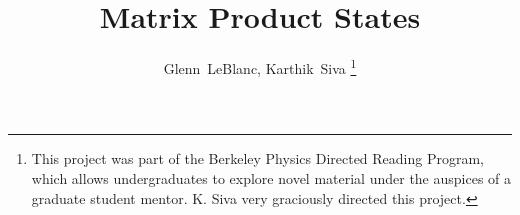 \documentclass[12pt]{article}
\begin{document}
\title{Matrix Product States}
%
%
%
\author{Glenn~LeBlanc,
Karthik~Siva
\thanks{This project was part of the Berkeley Physics Directed
Reading Program, which allows undergraduates to explore novel
material under the auspices of a graduate student mentor. K. Siva
very graciously directed this project.}}

\maketitle
\end{document}
